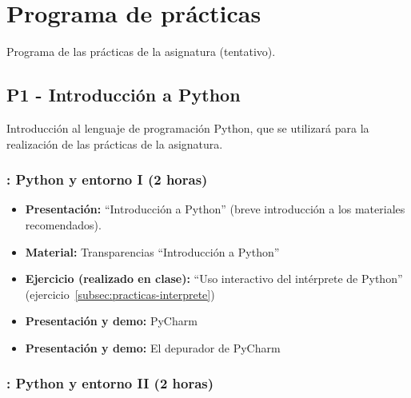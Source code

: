 \documentclass[a4paper,12pt]{article}
\begin{document}
\section{Programa de prácticas}

Programa de las prácticas de la asignatura (tentativo).

\subsection{P1 - Introducción a Python}

Introducción al lenguaje de programación Python, que se utilizará para la realización de las prácticas de la asignatura.

\subsubsection{\juevesA: Python y entorno I  (2 horas)}
\label{cal:juevesA}

\begin{itemize}
\item \textbf{Presentación:} ``Introducción a Python'' (breve introducción a los materiales recomendados).
\item \textbf{Material:} Transparencias ``Introducción a Python''
\item \textbf{Ejercicio (realizado en clase):} ``Uso interactivo del intérprete de Python'' (ejercicio~\ref{subsec:practicas-interprete})
\item \textbf{Presentación y demo:} PyCharm
\item \textbf{Presentación y demo:} El depurador de PyCharm

\end{itemize}

\subsubsection{\juevesB: Python y entorno II  (2 horas)}
\label{cal:juevesB}
\end{document}
